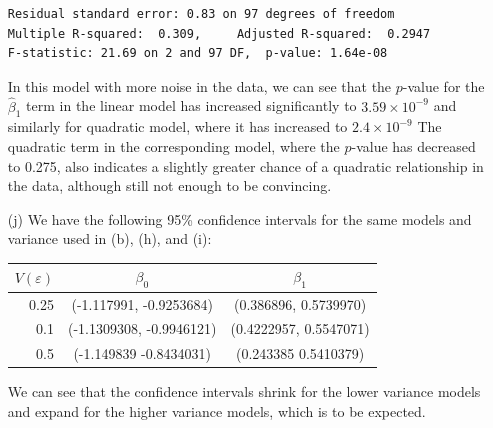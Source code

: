 \begin{itemize}
\begin{lstlisting}
Residual standard error: 0.83 on 97 degrees of freedom
Multiple R-squared:  0.309,     Adjusted R-squared:  0.2947
F-statistic: 21.69 on 2 and 97 DF,  p-value: 1.64e-08
        \end{lstlisting}
        In this model with more noise in the data, we can see that the
        $p$-value for the $\hat{\beta}_1$ term in the linear model has
        increased significantly to $3.59 \times {10}^{-9}$ and similarly
        for quadratic model, where it has increased to $2.4 \times {10}^{-9}$
        The quadratic term in the corresponding model, where the $p$-value
        has decreased to 0.275, also indicates a slightly greater chance
        of a quadratic relationship in the data, although still not enough
        to be convincing.
    \item[(j)] We have the following 95\% confidence intervals for
        the same models and variance used in (b), (h), and (i):
        \begin{center}
            \begin{tabular}{ r | c | c }
                \multicolumn{1}{c}{$V(\varepsilon)$} & \multicolumn{1}{c}{$\beta_0$}
                & \multicolumn{1}{c}{$\beta_1$}\\
                \hline
                0.25 & (-1.117991, -0.9253684)  & (0.386896, 0.5739970) \\
                0.1  & (-1.1309308, -0.9946121) & (0.4222957, 0.5547071) \\
                0.5  & (-1.149839 -0.8434031)   & (0.243385  0.5410379) \\
            \end{tabular}
        \end{center}
        We can see that the confidence intervals shrink for the lower variance
        models and expand for the higher variance models, which is to be expected.
\end{itemize}
